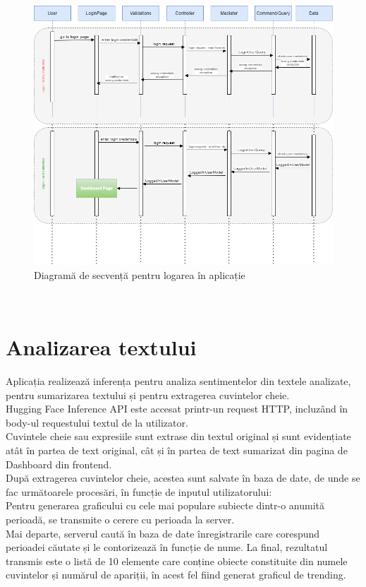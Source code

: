 \begin{figure}[h]
	\centering
	\includegraphics[width=150mm]{figs/sequnce.png}
	\caption{Diagramă de secvență pentru logarea în aplicație}
	\label{fig:sequnce}
\end{figure} 

\ \\ 
\section{Analizarea textului}
Aplicația realizează inferența pentru analiza sentimentelor din textele analizate, pentru sumarizarea textului și pentru extragerea cuvintelor cheie.\\
Hugging Face Inference API este accesat printr-un request HTTP, incluzând în body-ul requestului textul de la utilizator.\\

Cuvintele cheie sau expresiile sunt extrase din textul original și sunt evidențiate atât în partea de text original, cât și în partea de text sumarizat din pagina de Dashboard din frontend.\\
După extragerea cuvintelor cheie, acestea sunt salvate în baza de date, de unde se fac următoarele procesări, în funcție de inputul utilizatorului: \\

Pentru generarea graficului cu cele mai populare subiecte dintr-o anumită perioadă, se transmite o cerere cu perioada la server.\\
Mai departe, serverul caută în baza de date înregistrarile care corespund perioadei căutate și le contorizează în funcție de nume.
La final, rezultatul transmis este o listă de 10 elemente care conține obiecte constituite din numele cuvintelor și numărul de apariții, în acest fel fiind generat graficul de trending.\\

